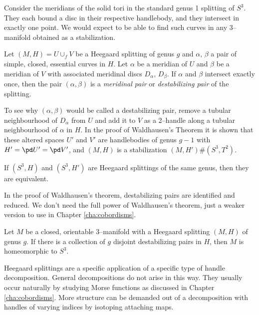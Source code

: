 Consider the meridians of the solid tori in the standard genus 1 splitting of $S^3$.
They each bound a disc in their respective handlebody, and they intersect in exactly one point.
We would expect to be able to find such curves in any 3--manifold obtained as a stabilization.
	
\begin{defn}	
	Let $(M,H)=U\cup_f V$ be a Heegaard splitting of genus $g$ and $\alpha$, $\beta$ a pair of simple, closed, essential curves in $H$.
	Let $\alpha$ be a meridian of $U$ and $\beta$ be a meridian of $V$ with associated meridinal discs $D_\alpha$, $D_\beta$.
	If $\alpha$ and $\beta$ intersect exactly once, then the pair $(\alpha,\beta)$ is a \emph{meridinal pair} or \emph{destabilizing pair} of the splitting.
\end{defn}

To see why $(\alpha,\beta)$ would be called a destabilizing pair, remove a tubular neighbourhood of $D_\alpha$ from $U$ and add it to $V$ as a 2--handle along a tubular neighbourhood of $\alpha$ in $H$.
In the proof of Waldhausen's Theorem it is shown that these altered spaces $U'$ and $V'$ are handlebodies of genus $g-1$ with $H'= \pd U' = \pd V'$, and $(M,H)$ is a stabilization $(M,H')\#(S^3,T^2)$.

\begin{theorem}
	If $(S^3,H)$ and $(S^3,H')$ are Heegaard splittings of the same genus, then they are equivalent.
\end{theorem}

In the proof of Waldhausen's theorem, destabilizing pairs are identified and reduced.
We don't need the full power of Waldhausen's theorem, just a weaker version to use in Chapter \ref{cha:cobordisms}.

\begin{theorem}
	\label{thm:lilwald}
	Let $M$ be a closed, orientable 3--manifold with a Heegaard splitting $(M,H)$ of genus $g$.
	If there is a collection of $g$ disjoint destabilizing pairs in $H$, then $M$ is homeomorphic to $S^3$.
\end{theorem}

Heegaard splittings are a specific application of a specific type of handle decomposition.
General decompositions do not arise in this way.
They usually occur naturally by studying Morse functions as discussed in Chapter \ref{cha:cobordisms}.
More structure can be demanded out of a decomposition with handles of varying indices by isotoping attaching maps.

